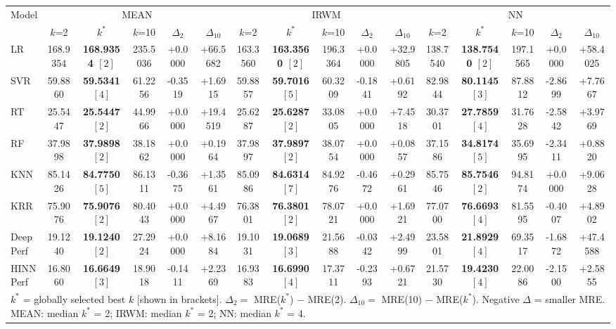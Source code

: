 \begin{tabular}{lccccccccccccccc}
\toprule
Model & \multicolumn{5}{c}{MEAN} & \multicolumn{5}{c}{IRWM} & \multicolumn{5}{c}{NN} \\
\cmidrule{2-6}\cmidrule{7-11}\cmidrule{12-16}
& $k$=2 & $k^*$ & $k$=10 & $\Delta_{2}$ & $\Delta_{10}$ & $k$=2 & $k^*$ & $k$=10 & $\Delta_{2}$ & $\Delta_{10}$ & $k$=2 & $k^*$ & $k$=10 & $\Delta_{2}$ & $\Delta_{10}$ \\
\midrule
LR & 168.9354 & \textbf{168.9354 $[2]$} & 235.5036 & +0.0000 & +66.5682 & 163.3560 & \textbf{163.3560 $[2]$} & 196.3364 & +0.0000 & +32.9805 & 138.7540 & \textbf{138.7540 $[2]$} & 197.1565 & +0.0000 & +58.4025 \\
SVR & 59.8860 & \textbf{59.5341 $[4]$} & 61.2256 & -0.3519 & +1.6915 & 59.8857 & \textbf{59.7016 $[5]$} & 60.3209 & -0.1841 & +0.6192 & 82.9844 & \textbf{80.1145 $[3]$} & 87.8812 & -2.8699 & +7.7667 \\
RT & 25.5447 & \textbf{25.5447 $[2]$} & 44.9966 & +0.0000 & +19.4519 & 25.6287 & \textbf{25.6287 $[2]$} & 33.0805 & +0.0000 & +7.4518 & 30.3701 & \textbf{27.7859 $[4]$} & 31.7628 & -2.5842 & +3.9769 \\
RF & 37.9898 & \textbf{37.9898 $[2]$} & 38.1862 & +0.0000 & +0.1964 & 37.9897 & \textbf{37.9897 $[2]$} & 38.0754 & +0.0000 & +0.0857 & 37.1586 & \textbf{34.8174 $[5]$} & 35.6995 & -2.3411 & +0.8820 \\
KNN & 85.1426 & \textbf{84.7750 $[5]$} & 86.1311 & -0.3675 & +1.3561 & 85.0986 & \textbf{84.6314 $[7]$} & 84.9276 & -0.4672 & +0.2961 & 85.7546 & \textbf{85.7546 $[2]$} & 94.8174 & +0.0000 & +9.0628 \\
KRR & 75.9076 & \textbf{75.9076 $[2]$} & 80.4043 & +0.0000 & +4.4967 & 76.3801 & \textbf{76.3801 $[2]$} & 78.0721 & +0.0000 & +1.6921 & 77.0700 & \textbf{76.6693 $[4]$} & 81.5595 & -0.4007 & +4.8902 \\
DeepPerf & 19.1240 & \textbf{19.1240 $[2]$} & 27.2924 & +0.0000 & +8.1684 & 19.1031 & \textbf{19.0689 $[3]$} & 21.5688 & -0.0342 & +2.4999 & 23.5801 & \textbf{21.8929 $[4]$} & 69.3517 & -1.6872 & +47.4588 \\
HINNPerf & 16.8060 & \textbf{16.6649 $[3]$} & 18.9018 & -0.1411 & +2.2369 & 16.9383 & \textbf{16.6990 $[4]$} & 17.3711 & -0.2393 & +0.6721 & 21.5730 & \textbf{19.4230 $[4]$} & 22.0086 & -2.1500 & +2.5855 \\
\bottomrule
\multicolumn{16}{l}{\footnotesize $k^*$ = globally selected best $k$ [shown in brackets]. $\Delta_2 = $ MRE($k^*$) $-$ MRE(2). $\Delta_{10} = $ MRE(10) $-$ MRE($k^*$). Negative $\Delta$ = smaller MRE. MEAN: median $k^*$ = 2; IRWM: median $k^*$ = 2; NN: median $k^*$ = 4.}
\end{tabular}
